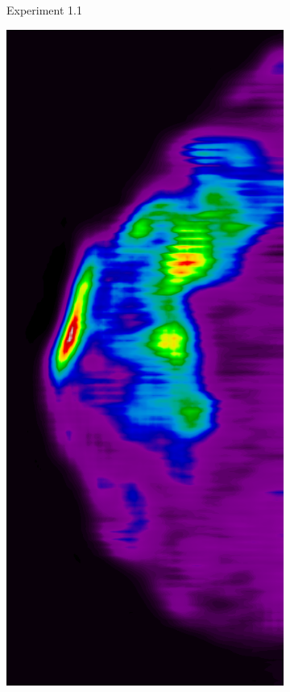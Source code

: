 \begin{figure}[h!]
\begin{subfigure}{0.195\textwidth}
		\caption{Experiment 1.1}
    \end{subfigure}
	\begin{subfigure}{0.195\textwidth}
		\centering
			\includegraphics[width=\textwidth]{plots/examples/example3_probs_1_2.png}

\end{subfigure}
\end{figure}
